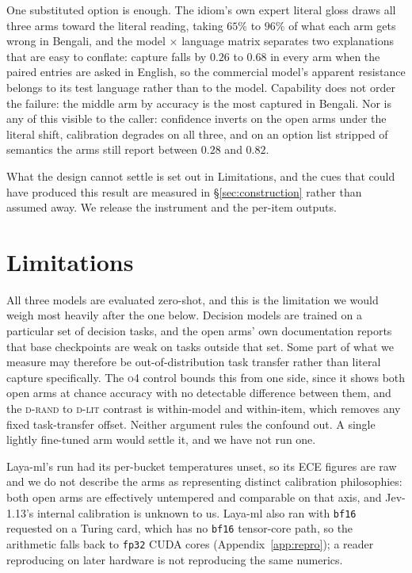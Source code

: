 \documentclass[11pt]{article}
\newcommand{\Drand}{\textsc{d-rand}}
\newcommand{\Dlit}{\textsc{d-lit}}
\begin{document}
One substituted option is enough. The idiom's own expert literal gloss draws all
three arms toward the literal reading, taking $65\%$ to $96\%$ of what each arm
gets wrong in Bengali, and the model $\times$ language matrix separates two
explanations that are easy to conflate: capture falls by $0.26$ to $0.68$ in every
arm when the paired entries are asked in English, so the commercial model's
apparent resistance belongs to its test language rather than to the model.
Capability does not order the failure: the middle arm by accuracy is the most
captured in Bengali. Nor is any of this visible to the caller: confidence inverts on
the open arms under the literal shift, calibration degrades on all three, and on an option
list stripped of semantics the arms still report between $0.28$ and $0.82$.

What the design cannot settle is set out in Limitations, and the cues that could
have produced this result are measured in \S\ref{sec:construction} rather than
assumed away. We release the instrument and the per-item outputs.

\section*{Limitations}

All three models are evaluated zero-shot, and this is the limitation we would
weigh most heavily after the one below. Decision models are trained on a
particular set of decision tasks, and the open arms' own documentation reports
that base checkpoints are weak on tasks outside that set. Some part of what we
measure may therefore be out-of-distribution task transfer rather than literal
capture specifically. The \textsc{o4} control bounds this from one side, since
it shows both open arms at chance accuracy with no detectable difference between
them, and the
\Drand{} to \Dlit{} contrast is within-model and within-item, which removes any
fixed task-transfer offset. Neither argument rules the confound out. A single
lightly fine-tuned arm would settle it, and we have not run one.

Laya-ml's run had its per-bucket temperatures unset, so its ECE figures are raw
and we do not describe the arms as representing distinct calibration philosophies:
both open arms are effectively untempered and comparable on that axis, and
Jev-1.13's internal calibration is unknown to us. Laya-ml also ran with
\texttt{bf16} requested on a Turing card, which has no \texttt{bf16} tensor-core
path, so the arithmetic falls back to \texttt{fp32} CUDA cores
(Appendix~\ref{app:repro}); a reader reproducing on
later hardware is not reproducing the same numerics.
\end{document}
